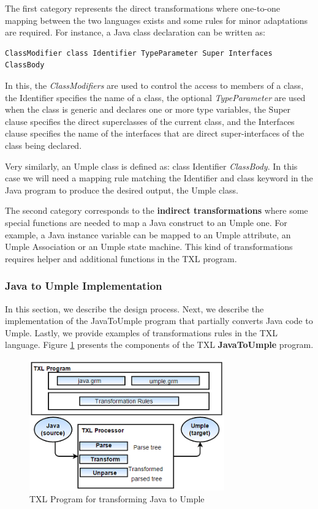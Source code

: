 The first category represents the direct transformations where one-to-one mapping between the two languages exists and some rules for minor adaptations are required. For instance, a Java class declaration can be written as: 

\vspace{\baselineskip}
\begin{lstlisting}[style=umplePlain]
ClassModifier class Identifier TypeParameter Super Interfaces ClassBody
\end{lstlisting}

In this, the \textit{ClassModifiers} are used to control the access to members of a class, the Identifier specifies the name of a class, the optional \textit{TypeParameter} are used when the class is generic and declares one or more type variables, the Super clause specifies the direct superclasses of the current class, and the Interfaces clause specifies the name of the interfaces that are direct super-interfaces of the class being declared.

Very similarly, an Umple class is defined as: class Identifier \textit{ClassBody}. In this case we will need a mapping rule matching the Identifier and class keyword in the Java program to produce the desired output, the Umple class. 

The second category corresponds to the \textbf{indirect transformations} where some special functions are needed to map a Java construct to an Umple one. For example, a Java instance variable can be mapped to an Umple attribute, an Umple Association or an Umple state machine. This kind of transformations requires helper and additional functions in the TXL program. 

\subsubsection{Java to Umple Implementation}

In this section, we describe the design process. Next, we describe the implementation of the JavaToUmple program that partially converts Java code to Umple. Lastly, we provide examples of transformations rules in the TXL language. Figure \ref{fig:txl} presents the components of the TXL \textbf{JavaToUmple} program. 

\begin{figure}[h]
\centering
\includegraphics[width=0.75\textwidth]{Figures/TXLprogram.png} 
\caption{TXL Program for transforming Java to Umple}
\label{fig:txl}
\end{figure}

